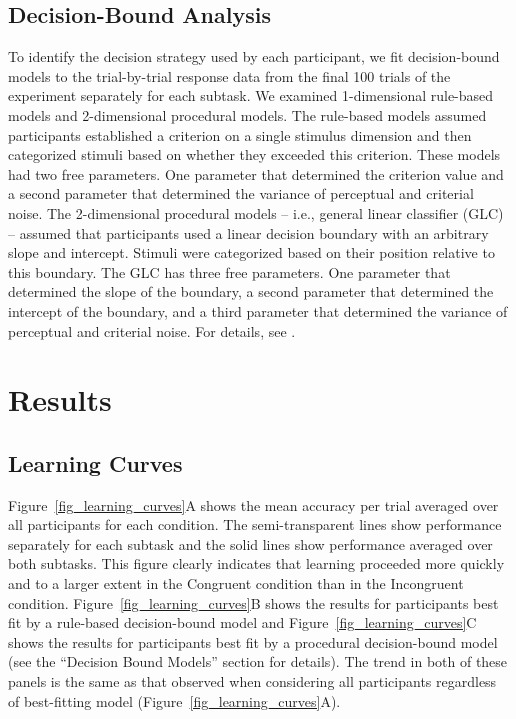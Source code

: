 \documentclass[doc, floatsintext]{apa7}
\begin{document}
\subsection{Decision-Bound Analysis}
To identify the decision strategy used by each participant,
we fit decision-bound models
\parencite{maddox_comparing_1993, ashby_decision_1988} to
the trial-by-trial response data from the final 100 trials
of the experiment separately for each subtask. We examined
1-dimensional rule-based models and 2-dimensional procedural
models.  The rule-based models assumed participants
established a criterion on a single stimulus dimension and
then categorized stimuli based on whether they exceeded this
criterion. These models had two free parameters. One
parameter that determined the criterion value and a second
parameter that determined the variance of perceptual and
criterial noise. The 2-dimensional procedural models --
i.e., general linear classifier (GLC) --  assumed that
participants used a linear decision boundary with an
arbitrary slope and intercept.  Stimuli were categorized
based on their position relative to this boundary. The GLC
has three free parameters. One parameter that determined the
slope of the boundary, a second parameter that determined
the intercept of the boundary, and a third parameter that
determined the variance of perceptual and criterial noise.
For details, see \textcite{ashby_multiple_2017}.

\section{Results}

\subsection{Learning Curves}
Figure~\ref{fig_learning_curves}A shows the mean accuracy
per trial averaged over all participants for each condition.
The semi-transparent lines show performance separately for
each subtask and the solid lines show performance averaged
over both subtasks.  This figure clearly indicates that
learning proceeded more quickly and to a larger extent in
the Congruent condition than in the Incongruent condition.
Figure~\ref{fig_learning_curves}B shows the results for
participants best fit by a rule-based decision-bound model
and Figure~\ref{fig_learning_curves}C shows the results for
participants best fit by a procedural decision-bound model
(see the ``Decision Bound Models'' section for details). The
trend in both of these panels is the same as that observed
when considering all participants regardless of best-fitting
model (Figure~\ref{fig_learning_curves}A).
\end{document}
